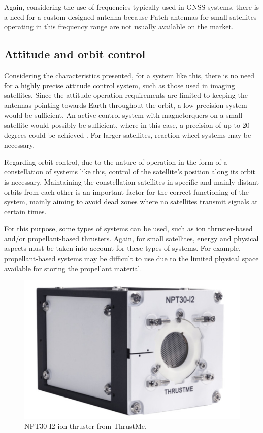 Again, considering the use of frequencies typically used in GNSS systems, there is a need for a custom-designed antenna because Patch antennas for small satellites operating in this frequency range are not usually available on the market.

\subsection{Attitude and orbit control}

Considering the characteristics presented, for a system like this, there is no need for a highly precise attitude control system, such as those used in imaging satellites. Since the attitude operation requirements are limited to keeping the antennas pointing towards Earth throughout the orbit, a low-precision system would be sufficient. An active control system with magnetorquers on a small satellite would possibly be sufficient, where in this case, a precision of up to 20 degrees could be achieved \cite{carrara2017}. For larger satellites, reaction wheel systems may be necessary.

Regarding orbit control, due to the nature of operation in the form of a constellation of systems like this, control of the satellite's position along its orbit is necessary. Maintaining the constellation satellites in specific and mainly distant orbits from each other is an important factor for the correct functioning of the system, mainly aiming to avoid dead zones where no satellites transmit signals at certain times.

For this purpose, some types of systems can be used, such as ion thruster-based and/or propellant-based thrusters. Again, for small satellites, energy and physical aspects must be taken into account for these types of systems. For example, propellant-based systems may be difficult to use due to the limited physical space available for storing the propellant material.

\begin{figure}[!ht]
    \begin{center}
        \includegraphics[width=0.5\columnwidth]{figures/npt30-i2}
        \caption{NPT30-I2 ion thruster from ThrustMe.}
        \label{fig:thrustme-npt30-i2}
    \end{center}
\end{figure}

